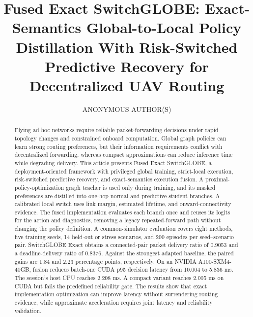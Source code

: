 \documentclass{ieeeaccess}
\begin{document}

\title{Fused Exact SwitchGLOBE: Exact-Semantics Global-to-Local Policy Distillation With Risk-Switched Predictive Recovery for Decentralized UAV Routing}
\author{\uppercase{Anonymous Author(s)}}
\address[1]{Affiliation withheld for double-blind draft preparation}

\begin{abstract}
Flying ad hoc networks require reliable packet-forwarding decisions under rapid topology changes and constrained onboard computation. Global graph policies can learn strong routing preferences, but their information requirements conflict with decentralized forwarding, whereas compact approximations can reduce inference time while degrading delivery. This article presents Fused Exact SwitchGLOBE, a deployment-oriented framework with privileged global training, strict-local execution, risk-switched predictive recovery, and exact-semantics execution fusion. A proximal-policy-optimization graph teacher is used only during training, and its masked preferences are distilled into one-hop normal and predictive student branches. A calibrated local switch uses link margin, estimated lifetime, and onward-connectivity evidence. The fused implementation evaluates each branch once and reuses its logits for the action and diagnostics, removing a legacy repeated-forward path without changing the policy definition. A common-simulator evaluation covers eight methods, five training seeds, 14 held-out or stress scenarios, and 200 episodes per seed--scenario pair. SwitchGLOBE Exact obtains a connected-pair packet delivery ratio of 0.9053 and a deadline-delivery ratio of 0.8376. Against the strongest adapted baseline, the paired gains are 1.84 and 2.23 percentage points, respectively. On an NVIDIA A100-SXM4-40GB, fusion reduces batch-one CUDA p95 decision latency from 10.004 to 5.836 ms. The session's host CPU reaches 2.208 ms. A compact variant reaches 2.005 ms on CUDA but fails the predefined reliability gate. The results show that exact implementation optimization can improve latency without surrendering routing evidence, while approximate acceleration requires joint latency and reliability validation.
\end{abstract}
\end{document}
